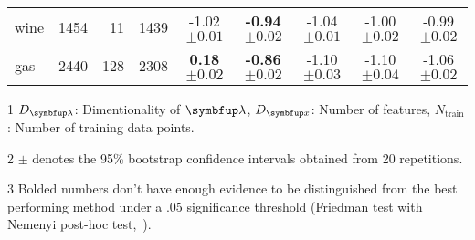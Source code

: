 \begin{table*}
\begin{threeparttable}
\begin{tabular}{lrrrccccc}
    \textsf{wine} & 1454 & 11 & 1439 & {-1.02 {\scriptsize{\(\pm 0.01\)}}} & {\bf-0.94 {\scriptsize{\(\pm 0.02\)}}} & {-1.04 {\scriptsize{\(\pm 0.01\)}}} & {-1.00 {\scriptsize{\(\pm 0.02\)}}} & {-0.99 {\scriptsize{\(\pm 0.02\)}}} \\
    \textsf{gas} & 2440 & 128 & 2308 & {\bf{0.18} {\scriptsize{\(\pm 0.02\)}}} & {\bf-0.86 {\scriptsize{\(\pm 0.02\)}}} & {-1.10 {\scriptsize{\(\pm 0.03\)}}} & {-1.10 {\scriptsize{\(\pm 0.04\)}}} & {-1.06 {\scriptsize{\(\pm 0.02\)}}} 
    \\\bottomrule
  \end{tabular}
  \begin{tablenotes}
    \item[1] {\footnotesize \(D_{\vlambda}\): Dimentionality of \(\vlambda\), \(D_{\vx}\): Number of features, \(N_{\text{train}}\): Number of training data points.}
    \item[2] {\footnotesize \(\pm\) denotes the 95\% bootstrap confidence intervals obtained from 20 repetitions.}
    \item[3] {\footnotesize Bolded numbers don't have enough evidence to be distinguished from the best performing method under a .05 significance threshold (Friedman test with Nemenyi post-hoc test,~\citealt{JMLR:v7:demsar06a})}.
  \end{tablenotes}
  \end{threeparttable}
  \vspace{-0.2in}
\end{table*}

